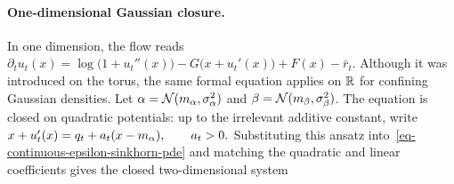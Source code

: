 \paragraph{One-dimensional Gaussian closure.}
In one dimension, the flow reads \(\partial_tu_t(x) = \log\bigl(1+u_t''(x)\bigr) -G\bigl(x+u_t'(x)\bigr)+F(x)-\bar r_t.\)
Although it was introduced on the torus, the same formal equation applies on $\mathbb{R}$ for confining Gaussian densities. Let $\alpha=\mathcal{N}(m_\alpha,\sigma_\alpha^2)$ and $\beta=\mathcal{N}(m_\beta,\sigma_\beta^2)$. The equation is closed on quadratic potentials: up to the irrelevant additive constant, write
\(x+u_t'(x)=q_t+a_t(x-m_\alpha), \qquad a_t>0.\)
Substituting this ansatz into~\eqref{eq-continuous-epsilon-sinkhorn-pde} and matching the quadratic and linear coefficients gives the closed two-dimensional system
